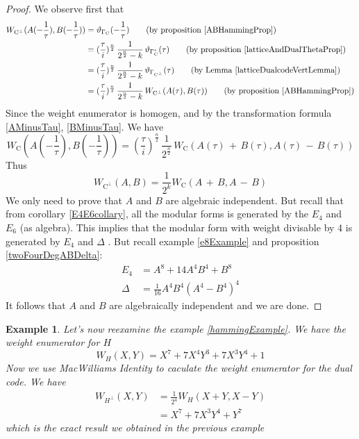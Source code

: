 \documentclass{article}
\newtheorem{example}[theorem]{Example}
\numberwithin{equation}{theorem}
\numberwithin{figure}{theorem}
\newcommand{\simpleCodes}{\ensuremath{\mathrm{C}}}
\newcommand{\buildVertical}[1]{\ensuremath{#1^{\bot}}}
\newcommand{\buildLattice}[1]{\ensuremath{\Gamma_{#1}}}
\newcommand{\weightEnumerator}[3]{\ensuremath{W_{#1}(#2,#3)}}
\newcommand{\thetaFunction}[1]{\ensuremath{\vartheta_{#1}}}
\newcommand{\imaginary}{\ensuremath{i}}
\begin{document}
\begin{proof}
We observe first that
\begin{align*}
	\weightEnumerator{\buildVertical{\simpleCodes}}{A(-\frac{1}{\tau})}{B(-\frac{1}{\tau})} &= \thetaFunction{\buildLattice{\simpleCodes}}(-\frac{1}{\tau}) \tag{by proposition \ref{ABHammingProp}} \\ %
	&= (\frac{\tau}{\imaginary})^{\frac{n}{2}} \, \frac{1}{2^{\frac{n}{2}} - k} \,\thetaFunction{\buildLattice{\simpleCodes}^*}(\tau) \tag{by proposition \ref{latticeAndDualThetaProp}}\\  %
		&= (\frac{\tau}{\imaginary})^{\frac{n}{2}} \, \frac{1}{2^{\frac{n}{2}} - k} \,\thetaFunction{\buildLattice{\buildVertical{\simpleCodes}}}(\tau)\tag{by Lemma \ref{latticeDualcodeVertLemma}}\\ %
		&= (\frac{\tau}{\imaginary})^{\frac{n}{2}} \, \frac{1}{2^{\frac{n}{2}} - k} \,\weightEnumerator{\buildVertical{\simpleCodes}}{A(\tau)}{B(\tau)} \tag{by proposition \ref{ABHammingProp}}
\end{align*}
Since the weight enumerator is homogen, and by the transformation formula \ref{AMinusTau}, \ref{BMinusTau}. We have
\[
	\weightEnumerator{\simpleCodes}{A(-\frac{1}{\tau})}{B(-\frac{1}{\tau})} = (\frac{\tau}{\imaginary})^{\frac{n}{2}} \, \frac{1}{2^{\frac{n}{2}}} \, \weightEnumerator{\simpleCodes}{A(\tau)\, + \,B(\tau)}{A(\tau) \,- \,B(\tau)}
\]
Thus
\[
	\weightEnumerator{\buildVertical{\simpleCodes}}{A}{B} = \frac{1}{2^k} \weightEnumerator{\simpleCodes}{A \,+\, B}{A \, - \, B}
\]
We only need to prove that $A$ and $B$ are algebraic independent. But recall that from corollary \ref{E4E6collary}, all the modular forms is generated by the $E_4$ and $E_6$ (as algebra). This implies that the modular form with weight divisable by 4 is generated by $E_4$ and $\Delta$ . But recall example \ref{e8Example} and proposition \ref{twoFourDegABDelta}:
\begin{align*}
	E_4 &= A^8 + 14A^4B^4 + B^8\\
	\Delta &= \frac{1}{16}A^4B^4(A^4 - B^4)^4
\end{align*}
It follows that $A$ and $B$ are algebraically independent and we are done.
\end{proof}
\begin{example}\label{macWilliamsHamingExample}
Let's now reexamine the example \ref{hammingExample}.
We have the weight enumerator for $H$
\[
	\weightEnumerator{H}{X}{Y} = X^7 + 7X^4Y^3 + 7X^3Y^4 + 1
\]
Now we use \emph{MacWilliams Identity} to caculate the weight enumerator for the dual code. We have
\begin{align*}
	\weightEnumerator{\buildVertical{H}}{X}{Y} 
	&= \frac{1}{2^4}\weightEnumerator{H}{X+Y}{X-Y}\\
	&= X^7 + 7X^3Y^4 + Y^7
\end{align*}
which is the exact result we obtained in the previous example
\end{example}
\end{document}
